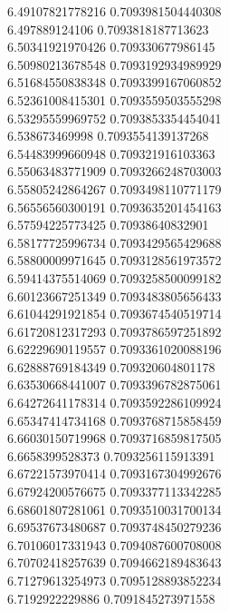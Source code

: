 {6.49107821778216 0.7093981504440308 \\
6.497889124106 0.7093818187713623 \\
6.50341921970426 0.709330677986145 \\
6.50980213678548 0.7093192934989929 \\
6.51684550838348 0.7093399167060852 \\
6.52361008415301 0.7093559503555298 \\
6.53295559969752 0.7093853354454041 \\
6.538673469998 0.7093554139137268 \\
6.54483999660948 0.709321916103363 \\
6.55063483771909 0.7093266248703003 \\
6.55805242864267 0.7093498110771179 \\
6.56556560300191 0.7093635201454163 \\
6.57594225773425 0.70938640832901 \\
6.58177725996734 0.7093429565429688 \\
6.58800009971645 0.7093128561973572 \\
6.59414375514069 0.7093258500099182 \\
6.60123667251349 0.7093483805656433 \\
6.61044291921854 0.7093674540519714 \\
6.61720812317293 0.7093786597251892 \\
6.62229690119557 0.7093361020088196 \\
6.62888769184349 0.709320604801178 \\
6.63530668441007 0.7093396782875061 \\
6.64272641178314 0.7093592286109924 \\
6.65347414734168 0.7093768715858459 \\
6.66030150719968 0.7093716859817505 \\
6.6658399528373 0.7093256115913391 \\
6.67221573970414 0.7093167304992676 \\
6.67924200576675 0.7093377113342285 \\
6.68601807281061 0.7093510031700134 \\
6.69537673480687 0.7093748450279236 \\
6.70106017331943 0.7094087600708008 \\
6.70702418257639 0.7094662189483643 \\
6.71279613254973 0.7095128893852234 \\
6.7192922229886 0.7091845273971558 \\
}
